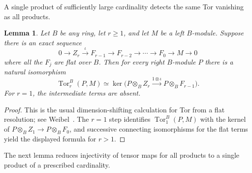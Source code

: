 \documentclass[11pt]{article}
\numberwithin{equation}{section}
\newtheorem{lemma}[theorem]{Lemma}
\theoremstyle{definition}
\theoremstyle{remark}
\newcommand{\Tor}{\operatorname{Tor}}
\begin{document}
A single product of sufficiently large cardinality detects the same
Tor vanishing as all products.

\begin{lemma}\label{lem:terminal-flat-resolution}
Let $B$ be any ring, let $r\ge1$, and let $M$ be a left $B$-module.  Suppose
there is an exact sequence
\[
0\longrightarrow Z_r\xrightarrow{\iota} F_{r-1}
\longrightarrow F_{r-2}\longrightarrow\cdots
\longrightarrow F_0\longrightarrow M\longrightarrow0
\]
where all the $F_j$ are flat over $B$.  Then for every right $B$-module
$P$ there is a natural isomorphism
\begin{equation}\label{eq:terminal-general}
\Tor_r^B(P,M)\simeq
\ker\bigl(P\otimes_BZ_r\xrightarrow{1\otimes\iota}
             P\otimes_BF_{r-1}\bigr).
\end{equation}
For $r=1$, the intermediate terms are absent.
\end{lemma}
\begin{proof}
This is the usual dimension-shifting calculation for Tor from a flat
resolution; see Weibel~\cite[Lemma~3.2.8 and its proof]{Weibel}.
The $r=1$ step identifies $\Tor_1^B(P,M)$ with the kernel of
$P\otimes_B Z_1\to P\otimes_B F_0$, and successive connecting
isomorphisms for the flat terms yield the displayed formula for $r>1$.
\end{proof}

The next lemma reduces injectivity of tensor maps for all products to a
single product of a prescribed cardinality.
\end{document}
